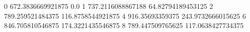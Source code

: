 0 672.3836669921875 0.0
1 737.2116088867188 64.82794189453125
2 789.259521484375 116.8758544921875
4 916.35693359375 243.9732666015625
6 846.705810546875 174.3221435546875
8 789.447509765625 117.0638427734375
